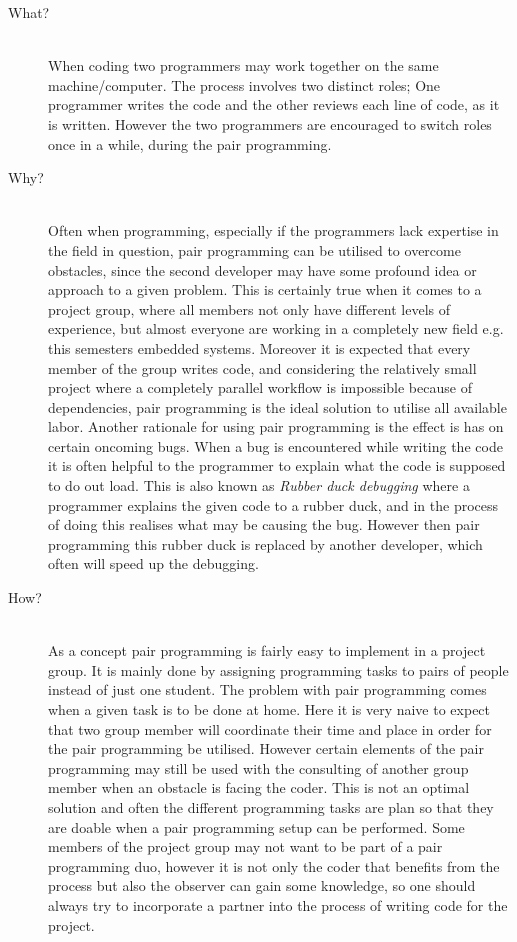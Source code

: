 \begin{description}
    \item[What?]\hfill\\
    When coding two programmers may work together on the same machine/computer.
The process involves two distinct roles; One programmer writes the code and the other reviews each line of code, as it is written. 
However the two programmers are encouraged to switch roles once in a while, during the pair programming.
    
    \item[Why?]\hfill\\ 
    Often when programming, especially if the programmers lack expertise in the field in question, pair programming can be utilised to overcome obstacles, since the second developer may have some profound idea or approach to a given problem.
    This is certainly true when it comes to a project group, where all members not only have different levels of experience, but almost everyone are working in a completely new field e.g. this semesters embedded systems.
    Moreover it is expected that every member of the group writes code, and considering the relatively small project where a completely parallel workflow is impossible because of dependencies, pair programming is the ideal solution to utilise all available labor.
    Another rationale for using pair programming is the effect is has on certain oncoming bugs.
    When a bug is encountered while writing the code it is often helpful to the programmer to explain what the code is supposed to do out load.
    This is also known as \emph{Rubber duck debugging} where a programmer explains the given code to a rubber duck, and in the process of doing this realises what may be causing the bug.
    However then pair programming this rubber duck is replaced by another developer, which often will speed up the debugging.
    
    \item[How?]\hfill\\
    As a concept pair programming is fairly easy to implement in a project group.
    It is mainly done by assigning programming tasks to pairs of people instead of just one student.
    The problem with pair programming comes when a given task is to be done at home.
    Here it is very naive to expect that two group member will coordinate their time and place in order for the pair programming be utilised.
    However certain elements of the pair programming may still be used with the consulting of another group member when an obstacle is facing the coder.
    This is not an optimal solution and often the different programming tasks are plan so that they are doable when a pair programming setup can be performed.
    Some members of the project group may not want to be part of a pair programming duo, however it is not only the coder that benefits from the process but also the observer can gain some knowledge, so one should always try to incorporate a partner into the process of writing code for the project. 
\end{description}
